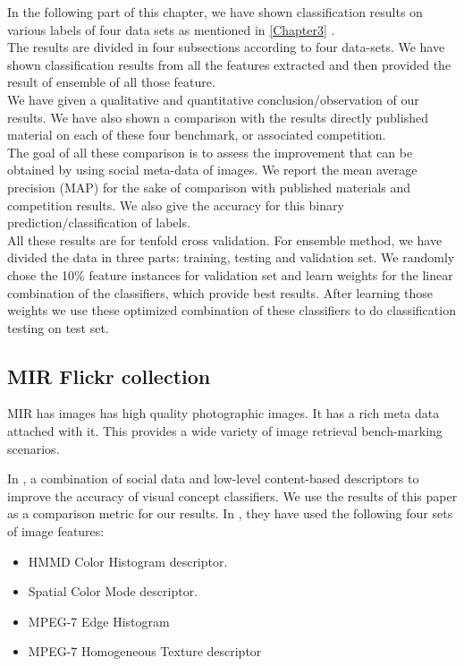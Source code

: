 In the following part of this chapter, we have shown classification results on various labels of four data sets as mentioned in \ref{Chapter3} .\\

The results are divided in four subsections according to four data-sets. We have shown classification results from all the features extracted and then provided the result of ensemble of all those feature.\\ 

We have given a qualitative and quantitative conclusion/observation of our results. We have also shown a comparison with the results directly published material on each of these four benchmark, or associated competition.\\ 
The goal of all these comparison is to assess the improvement that can be obtained by using social meta-data of images. We report the mean average precision (MAP) for the sake of comparison with published materials and competition results. We also give the accuracy for this binary prediction/classification of labels.\\
All these results are for tenfold cross validation. For ensemble method, we have divided the data in three parts: training, testing and validation set. We randomly chose the 10\% feature instances for validation set and learn weights for the linear combination of the classifiers, which provide best results. After learning those weights we use these optimized combination of these classifiers to do classification testing on test set.\\

\subsection{MIR Flickr collection }
MIR has images has high quality photographic images. It has a rich meta data attached with it. This provides a wide variety of image retrieval bench-marking scenarios.

  In \cite{MIRresults}, a combination of social data and low-level content-based descriptors to improve the accuracy of visual concept classifiers. We use the results of this paper as a comparison metric for our results.
 In \cite{MIRresults}, they have used the following four sets of image features:
\begin{itemize}
\item HMMD Color Histogram descriptor.
\item Spatial Color Mode descriptor.
\item MPEG-7 Edge Histogram
\item MPEG-7 Homogeneous Texture descriptor
\end{itemize}


